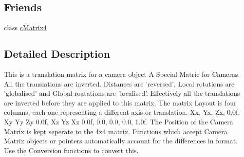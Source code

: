 \subsection*{Friends}
\begin{DoxyCompactItemize}
\item 
\hypertarget{classc_camera_matrix4_a9fe15ae517530a4ef2b8001131c522e3}{
class \hyperlink{classc_camera_matrix4_a9fe15ae517530a4ef2b8001131c522e3}{cMatrix4}}
\label{classc_camera_matrix4_a9fe15ae517530a4ef2b8001131c522e3}

\end{DoxyCompactItemize}


\subsection{Detailed Description}
This is a translation matrix for a camera object A Special Matric for Cameras. All the translations are inverted. Distances are 'reversed', Local rotations are 'globalised' and Global roatations are 'localised'. Effectively all the translations are inverted before they are applied to this matrix. The matrix Layout is four columns, each one representing a different axis or translation. Xx, Yx, Zx, 0.0f, Xy Yy Zy 0.0f, Xz Yz Xz 0.0f, 0.0, 0.0, 0.0, 1.0f. The Position of the Camera Matrix is kept seperate to the 4x4 matrix. Functions which accept Camera Matrix objects or pointers automatically account for the differences in format. Use the Conversion functions to convert this. 
